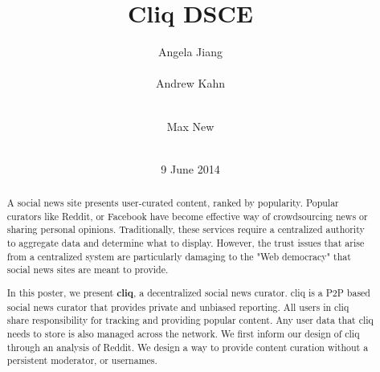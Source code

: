 \documentclass{sig-alternate}
\begin{document}
\nocite{*}


\title{Cliq DSCE}


\author{
\alignauthor Angela Jiang\\
  \\
\alignauthor Andrew Kahn\\
  \\
\and
\alignauthor Max New\\
  \\
}

\date{9 June 2014}

\maketitle
\begin{abstract}
A social news site presents user-curated content, ranked by popularity. Popular 
curators like Reddit, or Facebook have become effective way of crowdsourcing 
news or sharing personal opinions. Traditionally, these services require a 
centralized authority to aggregate data and determine what to display. However, 
the trust issues that arise from a centralized system are particularly damaging to 
the "Web democracy" that social news sites are meant to provide. 

In this poster, we present {\bf cliq}, a decentralized social news curator. cliq is a P2P based 
social news curator that provides private and unbiased reporting. All users in cliq share 
responsibility for tracking and providing popular content. Any user data that cliq needs 
to store is also managed across the network. We first inform our design of cliq through 
an analysis of Reddit. We design a way to provide content curation without a persistent 
moderator, or usernames.
\end{abstract}
\end{document}
